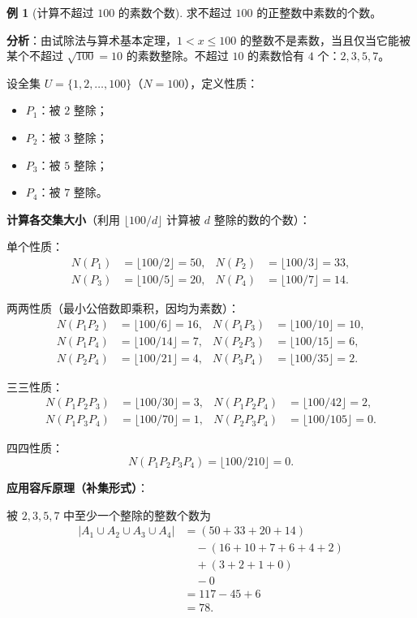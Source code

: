 \documentclass[UTF8,11pt,a4paper]{ctexbook}   %
\theoremstyle{definition}
\newtheorem{example}{例}[section]
\begin{document}
\begin{example}[计算不超过 $100$ 的素数个数]\label{ex:sieve-100}
求不超过 $100$ 的正整数中素数的个数。

\textbf{分析}：由试除法与算术基本定理，$1<x\le 100$ 的整数不是素数，当且仅当它能被某个不超过 $\sqrt{100}=10$ 的素数整除。不超过 $10$ 的素数恰有 $4$ 个：$2,3,5,7$。

设全集 $U=\{1,2,\dots,100\}$（$N=100$），定义性质：
\begin{itemize}
    \item $P_1$：被 $2$ 整除；
    \item $P_2$：被 $3$ 整除；
    \item $P_3$：被 $5$ 整除；
    \item $P_4$：被 $7$ 整除。
\end{itemize}

\textbf{计算各交集大小}（利用 $\lfloor 100/d\rfloor$ 计算被 $d$ 整除的数的个数）：

单个性质：
\begin{align*}
N(P_1)&=\lfloor 100/2\rfloor=50, & N(P_2)&=\lfloor 100/3\rfloor=33,\\
N(P_3)&=\lfloor 100/5\rfloor=20, & N(P_4)&=\lfloor 100/7\rfloor=14.
\end{align*}

两两性质（最小公倍数即乘积，因均为素数）：
\begin{align*}
N(P_1P_2)&=\lfloor 100/6\rfloor=16, & N(P_1P_3)&=\lfloor 100/10\rfloor=10,\\
N(P_1P_4)&=\lfloor 100/14\rfloor=7, & N(P_2P_3)&=\lfloor 100/15\rfloor=6,\\
N(P_2P_4)&=\lfloor 100/21\rfloor=4, & N(P_3P_4)&=\lfloor 100/35\rfloor=2.
\end{align*}

三三性质：
\begin{align*}
N(P_1P_2P_3)&=\lfloor 100/30\rfloor=3, & N(P_1P_2P_4)&=\lfloor 100/42\rfloor=2,\\
N(P_1P_3P_4)&=\lfloor 100/70\rfloor=1, & N(P_2P_3P_4)&=\lfloor 100/105\rfloor=0.
\end{align*}

四四性质：
\[
N(P_1P_2P_3P_4)=\lfloor 100/210\rfloor=0.
\]

\textbf{应用容斥原理（补集形式）}：

被 $2,3,5,7$ 中至少一个整除的整数个数为
\begin{align*}
|A_1\cup A_2\cup A_3\cup A_4|
&=(50+33+20+14)\\
&\quad-(16+10+7+6+4+2)\\
&\quad+(3+2+1+0)\\
&\quad-0\\
&=117-45+6\\
&=78.
\end{align*}


\end{example}
\end{document}
